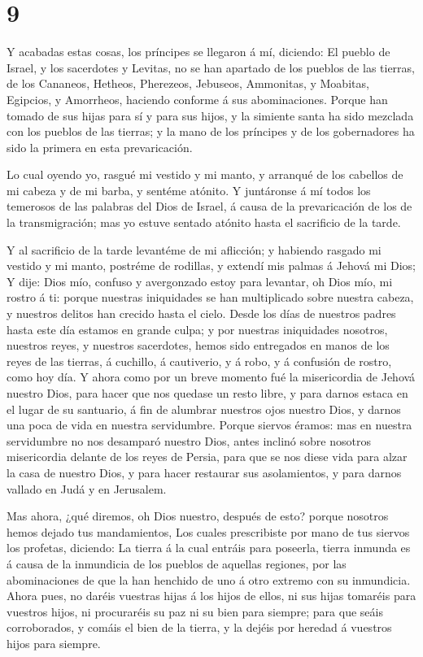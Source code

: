 \hypertarget{section-8}{%
\section{9}\label{section-8}}

 Y acabadas estas cosas, los príncipes se llegaron á mí,
diciendo: El pueblo de Israel, y los sacerdotes y Levitas, no se han
apartado de los pueblos de las tierras, de los Cananeos, Hetheos,
Pherezeos, Jebuseos, Ammonitas, y Moabitas, Egipcios, y Amorrheos,
haciendo conforme á sus abominaciones.  Porque han tomado de
sus hijas para sí y para sus hijos, y la simiente santa ha sido mezclada
con los pueblos de las tierras; y la mano de los príncipes y de los
gobernadores ha sido la primera en esta prevaricación.

 Lo cual oyendo yo, rasgué mi vestido y mi manto, y arranqué
de los cabellos de mi cabeza y de mi barba, y sentéme atónito.
 Y juntáronse á mí todos los temerosos de las palabras del
Dios de Israel, á causa de la prevaricación de los de la transmigración;
mas yo estuve sentado atónito hasta el sacrificio de la tarde.

 Y al sacrificio de la tarde levantéme de mi aflicción; y
habiendo rasgado mi vestido y mi manto, postréme de rodillas, y extendí
mis palmas á Jehová mi Dios;  Y dije: Dios mío, confuso y
avergonzado estoy para levantar, oh Dios mío, mi rostro á ti: porque
nuestras iniquidades se han multiplicado sobre nuestra cabeza, y
nuestros delitos han crecido hasta el cielo.  Desde los días
de nuestros padres hasta este día estamos en grande culpa; y por
nuestras iniquidades nosotros, nuestros reyes, y nuestros sacerdotes,
hemos sido entregados en manos de los reyes de las tierras, á cuchillo,
á cautiverio, y á robo, y á confusión de rostro, como hoy día.
 Y ahora como por un breve momento fué la misericordia de
Jehová nuestro Dios, para hacer que nos quedase un resto libre, y para
darnos estaca en el lugar de su santuario, á fin de alumbrar nuestros
ojos nuestro Dios, y darnos una poca de vida en nuestra servidumbre.
 Porque siervos éramos: mas en nuestra servidumbre no nos
desamparó nuestro Dios, antes inclinó sobre nosotros misericordia
delante de los reyes de Persia, para que se nos diese vida para alzar la
casa de nuestro Dios, y para hacer restaurar sus asolamientos, y para
darnos vallado en Judá y en Jerusalem.

 Mas ahora, ¿qué diremos, oh Dios nuestro, después de esto?
porque nosotros hemos dejado tus mandamientos,  Los cuales
prescribiste por mano de tus siervos los profetas, diciendo: La tierra á
la cual entráis para poseerla, tierra inmunda es á causa de la
inmundicia de los pueblos de aquellas regiones, por las abominaciones de
que la han henchido de uno á otro extremo con su inmundicia.
 Ahora pues, no daréis vuestras hijas á los hijos de ellos,
ni sus hijas tomaréis para vuestros hijos, ni procuraréis su paz ni su
bien para siempre; para que seáis corroborados, y comáis el bien de la
tierra, y la dejéis por heredad á vuestros hijos para siempre.

